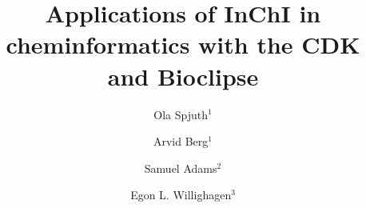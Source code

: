\documentclass[10pt]{bmc_article}
\newenvironment{bmcformat}{\fussy\setboolean{publ}{true}}{\fussy}
\begin{document}
\begin{bmcformat}



\title{Applications of InChI in cheminformatics with the CDK and Bioclipse}
 



\author{Ola Spjuth\correspondingauthor$^{1}$%
      \and
         Arvid Berg$^1$%
      \and
         Samuel Adams$^2$%
      \and    
         Egon L. Willighagen$^3$%
      }
      
      


\address{\\
\iid(1) Department of Pharmaceutical Biosciences, Uppsala University, 751 24 Uppsala, Sweden\\
\iid(2) Unilever Centre for Molecular Sciences Informatics, University Chemical Laboratory, Cambridge, CB2 1EW, United Kingdom\\
\iid(3) Department of Bioinformatics - BiGCaT, Maastricht University, Maastricht, NL-6200 MD, The Netherlands}




\maketitle


\end{bmcformat}
\end{document}
